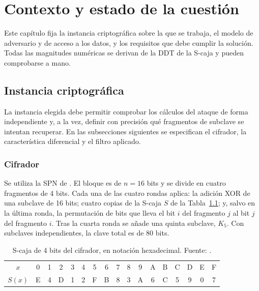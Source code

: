 \chapter{Contexto y estado de la cuestión}
\label{chap:requisitos}

Este capítulo fija la instancia criptográfica sobre la que se trabaja, el modelo de adversario y de acceso a los datos, y los requisitos que debe cumplir la solución. Todas las magnitudes numéricas se derivan de la DDT de la S-caja y pueden comprobarse a mano.

\section{Instancia criptográfica}
\label{sec:instancia}

La instancia elegida debe permitir comprobar los cálculos del ataque de forma independiente y, a la vez, definir con precisión qué fragmentos de subclave se intentan recuperar. En las subsecciones siguientes se especifican el cifrador, la característica diferencial y el filtro aplicado.

\subsection{Cifrador}

Se utiliza la SPN de \citet{heys2002}. El bloque es de \(n=16\) bits y se divide en cuatro fragmentos de 4 bits. Cada una de las cuatro rondas aplica: la adición XOR de una subclave de 16 bits; cuatro copias de la S-caja \(S\) de la Tabla~\ref{tab:sbox}; y, salvo en la última ronda, la permutación de bits que lleva el bit \(i\) del fragmento \(j\) al bit \(j\) del fragmento \(i\). Tras la cuarta ronda se añade una quinta subclave, \(K_5\). Con subclaves independientes, la clave total es de 80 bits.

\begin{table}[H]
\centering
\begin{tabular}{c|cccccccccccccccc}
\hline\hline
\(x\) & 0 & 1 & 2 & 3 & 4 & 5 & 6 & 7 & 8 & 9 & A & B & C & D & E & F \\
\(S(x)\) & E & 4 & D & 1 & 2 & F & B & 8 & 3 & A & 6 & C & 5 & 9 & 0 & 7 \\
\hline
\end{tabular}
\caption[S-caja del cifrador de Heys]{S-caja de 4 bits del cifrador, en notación hexadecimal. Fuente: \cite{heys2002}.}
\label{tab:sbox}
\end{table}

